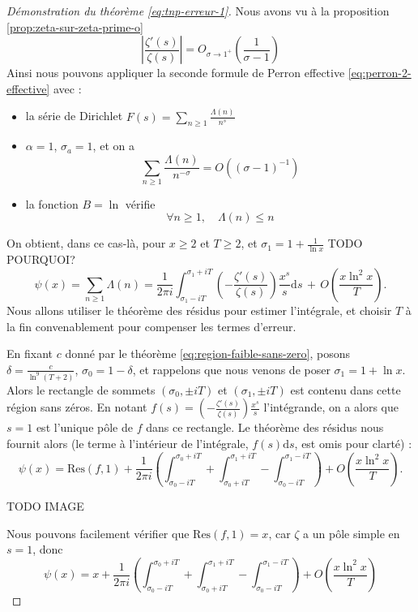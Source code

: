 \documentclass[french]{report}
\begin{document}
\begin{proof}[Démonstration du théorème \ref{eq:tnp-erreur-1}]
  Nous avons vu à la proposition \ref{prop:zeta-sur-zeta-prime-o} 
  \[ \left|\frac{\zeta'(s)}{\zeta(s)}\right| = O_{\sigma\to1^+}\left(\frac{1}{\sigma-1}\right) \]
  Ainsi nous pouvons appliquer la seconde formule de Perron effective \ref{eq:perron-2-effective} avec :
  \begin{itemize}
    \item la série de Dirichlet $F(s)=\sum_{n\geq1}\frac{\Lambda(n)}{n^s}$
    \item $\alpha=1$, $\sigma_a=1$, et on a
      \[ \sum_{n\geq1}\frac{\Lambda(n)}{n^{-\sigma}}=O((\sigma-1)^{-1}) \]
    \item la fonction $B=\ln$ vérifie
    \[ \forall n\geq1,\quad\Lambda(n)\leq n \]
  \end{itemize}
  On obtient, dans ce cas-là, pour $x\geq2$ et $T\geq2$, et $\sigma_1=1+\frac{1}{\ln x}$ TODO POURQUOI?
  \[ \psi(x) = \sum_{n\geq1}\Lambda(n) = \frac{1}{2\pi i}\int_{\sigma_1-iT}^{\sigma_1+iT}\left(-\frac{\zeta'(s)}{\zeta(s)}\right)\frac{x^s}{s}\mathrm{d}s\,+\,O\left(\frac{x\ln^2 x}{T}\right). \]
  Nous allons utiliser le théorème des résidus pour estimer l'intégrale, et choisir $T$ à la fin convenablement pour compenser les termes d'erreur.

  En fixant $c$ donné par le théorème \ref{eq:region-faible-sans-zero}, posons $\delta=\frac{c}{\ln^9(T+2)}$, $\sigma_0=1-\delta$, et rappelons que nous venons de poser $\sigma_1=1+\ln x$. Alors le rectangle de sommets $(\sigma_0,\pm iT)$ et $(\sigma_1,\pm iT)$ est contenu dans cette région sans zéros. En notant $f(s)=\left(-\frac{\zeta'(s)}{\zeta(s)}\right)\frac{x^s}{s}$ l'intégrande, on a alors que $s=1$ est l'unique pôle de $f$ dans ce rectangle. Le théorème des résidus nous fournit alors (le terme à l'intérieur de l'intégrale, $f(s)\mathrm{d}s$, est omis pour clarté) :
  \[ \psi(x) = \mathrm{Res}(f,1) + \frac{1}{2\pi i}\left(
    \int_{\sigma_0-iT}^{\sigma_0+iT}
    +\int_{\sigma_0+iT}^{\sigma_1+iT}
    -\int_{\sigma_0-iT}^{\sigma_1-iT}
    \right)
    +O\left(\frac{x\ln^2x}{T}\right). \]

  TODO IMAGE

  Nous pouvons facilement vérifier que $\mathrm{Res}(f,1)=x$, car $\zeta$ a un pôle simple en $s=1$, donc
  \begin{equation}\label{eq:tnp-faible-3-integrales}
    \psi(x) = x +\frac{1}{2\pi i}\left(
      \int_{\sigma_0-iT}^{\sigma_0+iT}
      +\int_{\sigma_0+iT}^{\sigma_1+iT}
      -\int_{\sigma_0-iT}^{\sigma_1-iT}
    \right)
    +O\left(\frac{x\ln^2x}{T}\right)
  \end{equation}


\end{proof}
\end{document}
